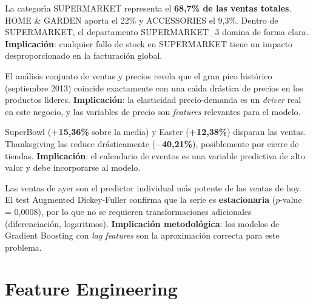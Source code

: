 \documentclass[12pt, a4paper, oneside]{report}
\begin{document}
\begin{tcolorbox}[canvasbox, title={Hallazgo 3 --- SUPERMARKET es el motor del negocio}]
La categor\'{\i}a SUPERMARKET representa el \textbf{68,7\% de las ventas totales}. HOME \& GARDEN aporta el 22\% y ACCESSORIES el 9,3\%. Dentro de SUPERMARKET, el departamento SUPERMARKET\_3 domina de forma clara. \textbf{Implicaci\'on}: cualquier fallo de stock en SUPERMARKET tiene un impacto desproporcionado en la facturaci\'on global.
\end{tcolorbox}

\begin{tcolorbox}[canvasbox, title={Hallazgo 4 --- El pico de 2013 fue provocado por bajada de precios}]
El an\'alisis conjunto de ventas y precios revela que el gran pico hist\'orico (septiembre 2013) coincide exactamente con una ca\'{\i}da dr\'astica de precios en los productos l\'{\i}deres. \textbf{Implicaci\'on}: la elasticidad precio-demanda es un \textit{driver} real en este negocio, y las variables de precio son \textit{features} relevantes para el modelo.
\end{tcolorbox}

\begin{tcolorbox}[canvasbox, title={Hallazgo 5 --- Impacto diferenciado de los eventos especiales}]
SuperBowl (\textbf{+15,36\%} sobre la media) y Easter (\textbf{+12,38\%}) disparan las ventas. Thanksgiving las reduce dr\'asticamente (\textbf{$-$40,21\%}), posiblemente por cierre de tiendas. \textbf{Implicaci\'on}: el calendario de eventos es una variable predictiva de alto valor y debe incorporarse al modelo.
\end{tcolorbox}

\begin{tcolorbox}[canvasbox, title={Hallazgo 6 --- Fuerte autocorrelaci\'on en lag~1 (ACF $\approx$ 0,78)}]
Las ventas de ayer son el predictor individual m\'as potente de las ventas de hoy. El test Augmented Dickey-Fuller confirma que la serie es \textbf{estacionaria} ($p$-value = 0,0008), por lo que no se requieren transformaciones adicionales (diferenciaci\'on, logaritmos). \textbf{Implicaci\'on metodol\'ogica}: los modelos de Gradient Boosting con \textit{lag features} son la aproximaci\'on correcta para este problema.
\end{tcolorbox}

\section{Feature Engineering}
\end{document}
